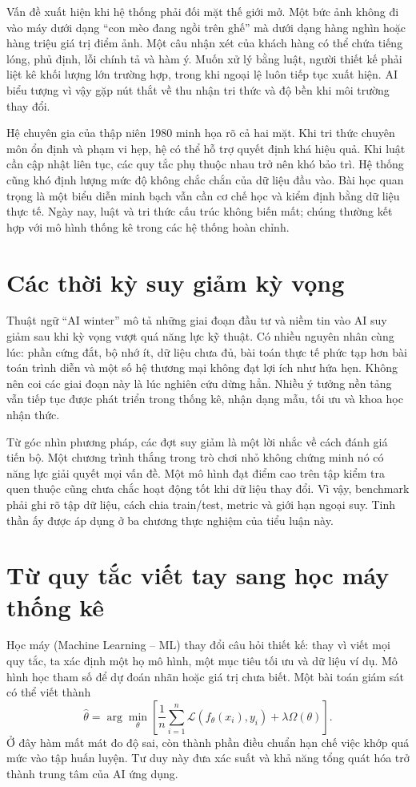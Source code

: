 \documentclass[12pt,a4paper]{report}
\begin{document}
Vấn đề xuất hiện khi hệ thống phải đối mặt thế giới mở. Một bức ảnh không đi vào máy dưới dạng ``con mèo đang ngồi trên ghế'' mà dưới dạng hàng nghìn hoặc hàng triệu giá trị điểm ảnh. Một câu nhận xét của khách hàng có thể chứa tiếng lóng, phủ định, lỗi chính tả và hàm ý. Muốn xử lý bằng luật, người thiết kế phải liệt kê khối lượng lớn trường hợp, trong khi ngoại lệ luôn tiếp tục xuất hiện. AI biểu tượng vì vậy gặp nút thắt về thu nhận tri thức và độ bền khi môi trường thay đổi.

Hệ chuyên gia của thập niên 1980 minh họa rõ cả hai mặt. Khi tri thức chuyên môn ổn định và phạm vi hẹp, hệ có thể hỗ trợ quyết định khá hiệu quả. Khi luật cần cập nhật liên tục, các quy tắc phụ thuộc nhau trở nên khó bảo trì. Hệ thống cũng khó định lượng mức độ không chắc chắn của dữ liệu đầu vào. Bài học quan trọng là một biểu diễn minh bạch vẫn cần cơ chế học và kiểm định bằng dữ liệu thực tế. Ngày nay, luật và tri thức cấu trúc không biến mất; chúng thường kết hợp với mô hình thống kê trong các hệ thống hoàn chỉnh.

\section{Các thời kỳ suy giảm kỳ vọng}
Thuật ngữ ``AI winter'' mô tả những giai đoạn đầu tư và niềm tin vào AI suy giảm sau khi kỳ vọng vượt quá năng lực kỹ thuật. Có nhiều nguyên nhân cùng lúc: phần cứng đắt, bộ nhớ ít, dữ liệu chưa đủ, bài toán thực tế phức tạp hơn bài toán trình diễn và một số hệ thương mại không đạt lợi ích như hứa hẹn. Không nên coi các giai đoạn này là lúc nghiên cứu dừng hẳn. Nhiều ý tưởng nền tảng vẫn tiếp tục được phát triển trong thống kê, nhận dạng mẫu, tối ưu và khoa học nhận thức.

Từ góc nhìn phương pháp, các đợt suy giảm là một lời nhắc về cách đánh giá tiến bộ. Một chương trình thắng trong trò chơi nhỏ không chứng minh nó có năng lực giải quyết mọi vấn đề. Một mô hình đạt điểm cao trên tập kiểm tra quen thuộc cũng chưa chắc hoạt động tốt khi dữ liệu thay đổi. Vì vậy, benchmark phải ghi rõ tập dữ liệu, cách chia train/test, metric và giới hạn ngoại suy. Tinh thần ấy được áp dụng ở ba chương thực nghiệm của tiểu luận này.

\section{Từ quy tắc viết tay sang học máy thống kê}
Học máy (Machine Learning -- ML) thay đổi câu hỏi thiết kế: thay vì viết mọi quy tắc, ta xác định một họ mô hình, một mục tiêu tối ưu và dữ liệu ví dụ. Mô hình học tham số để dự đoán nhãn hoặc giá trị chưa biết. Một bài toán giám sát có thể viết thành
\begin{equation}\hat{\theta}=\arg\min_{\theta}\left[\frac1n\sum_{i=1}^{n}\mathcal L(f_\theta(x_i),y_i)+\lambda\Omega(\theta)\right].\end{equation}
Ở đây hàm mất mát đo độ sai, còn thành phần điều chuẩn hạn chế việc khớp quá mức vào tập huấn luyện. Tư duy này đưa xác suất và khả năng tổng quát hóa trở thành trung tâm của AI ứng dụng.
\end{document}
